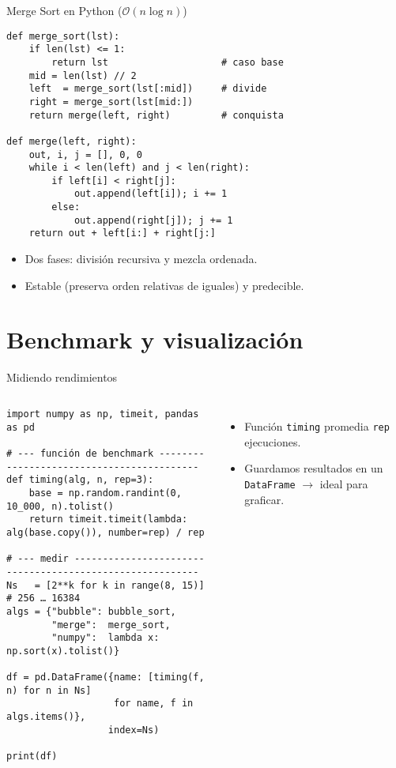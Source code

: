 \documentclass[10pt]{beamer}
\begin{document}
\begin{frame}[fragile]{Merge Sort en Python (\(\mathcal{O}(n\log n)\))}
\begin{verbatim}
def merge_sort(lst):
    if len(lst) <= 1:
        return lst                    # caso base
    mid = len(lst) // 2
    left  = merge_sort(lst[:mid])     # divide
    right = merge_sort(lst[mid:])
    return merge(left, right)         # conquista

def merge(left, right):
    out, i, j = [], 0, 0
    while i < len(left) and j < len(right):
        if left[i] < right[j]:
            out.append(left[i]); i += 1
        else:
            out.append(right[j]); j += 1
    return out + left[i:] + right[j:]
\end{verbatim}
\begin{itemize}
  \item Dos fases: división recursiva y mezcla ordenada.
  \item Estable (\alert{preserva orden relativas de iguales}) y predecible.
\end{itemize}
\end{frame}

\section{Benchmark y visualización}
\begin{frame}[fragile]{Midiendo rendimientos}
\begin{columns}
\begin{verbatim}
import numpy as np, timeit, pandas as pd

# --- función de benchmark ------------------------------------------
def timing(alg, n, rep=3):
    base = np.random.randint(0, 10_000, n).tolist()
    return timeit.timeit(lambda: alg(base.copy()), number=rep) / rep

# --- medir ---------------------------------------------------------
Ns   = [2**k for k in range(8, 15)]           # 256 … 16384
algs = {"bubble": bubble_sort,
        "merge":  merge_sort,
        "numpy":  lambda x: np.sort(x).tolist()}

df = pd.DataFrame({name: [timing(f, n) for n in Ns]
                   for name, f in algs.items()},
                  index=Ns)

print(df)
\end{verbatim}
\small
\begin{itemize}
  \item Función \texttt{timing} promedia \texttt{rep} ejecuciones.
  \item Guardamos resultados en un \texttt{DataFrame} $\longrightarrow$ ideal para graficar.
\end{itemize}
\end{columns}
\end{frame}
\end{document}
